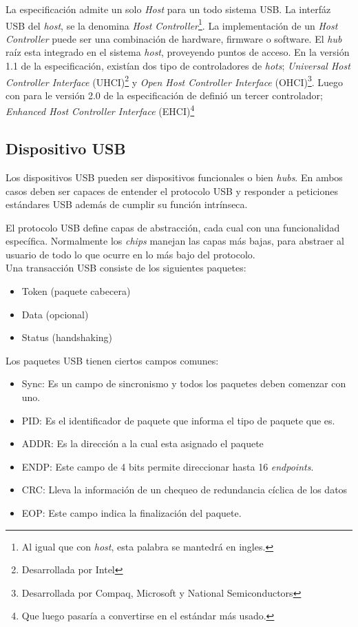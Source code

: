 La especificaci\'on admite un solo \emph{Host} para un todo sistema USB. La
interf\'az USB del \emph{host}, se la denomina \emph{Host
Controller}\footnote{Al igual que con \emph{host}, esta palabra se mantedr\'a
en ingles.}. La implementaci\'on de un \emph{Host Controller} puede ser una
combinaci\'on de hardware, firmware o software. El \emph{hub} ra\'iz esta
integrado en el sistema \emph{host}, proveyendo puntos de acceso.
En la versi\'on 1.1 de la especificaci\'on, exist\'ian dos tipo de
controladores de \emph{hots}; \emph{Universal Host Controller Interface}
(UHCI)\footnote{Desarrollada por Intel} y \emph{Open Host Controller Interface}
(OHCI)\footnote{Desarrollada por Compaq, Microsoft y National Semiconductors}.
Luego con para le versi\'on 2.0 de la especificaci\'on de defini\'o un tercer
controlador; \emph{Enhanced Host Controller Interface} (EHCI)\footnote{Que
luego pasar\'ia a convertirse en el est\'andar m\'as usado.}


\subsection{Dispositivo USB}

Los dispositivos USB pueden ser dispositivos funcionales o bien \emph{hubs}.
En ambos casos deben ser capaces de entender el protocolo USB y responder a
peticiones est\'andares USB adem\'as de cumplir su funci\'on intr\'inseca. 



El protocolo USB define capas de abstracci\'on, cada cual con una funcionalidad
espec\'ifica. Normalmente los \emph{chips} manejan las capas m\'as bajas, para
abstraer al usuario de todo lo que ocurre en lo m\'as bajo del protocolo.\\

Una transacci\'on USB consiste de los siguientes paquetes:
\begin{itemize}
 \item Token (paquete cabecera)
 \item Data (opcional)
 \item Status (handshaking)
\end{itemize}

Los paquetes USB tienen ciertos campos comunes: 
\begin{itemize}
 \item Sync: Es un campo de sincronismo y todos los paquetes deben comenzar
con uno.
 \item PID: Es el identificador de paquete que informa el tipo de paquete que
es.
 \item ADDR: Es la direcci\'on a la cual esta asignado el paquete
 \item ENDP: Este campo de 4 bits permite direccionar hasta 16
\emph{endpoints}.
 \item CRC: Lleva la informaci\'on de un chequeo de redundancia c\'iclica de
los datos
 \item EOP: Este campo indica la finalizaci\'on del paquete.
\end{itemize}


